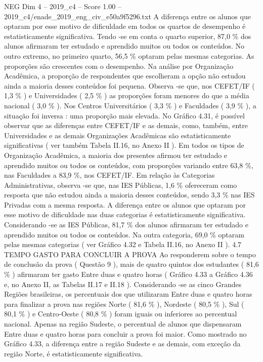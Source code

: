 \begin{textsample}{NEG Dim 4 – 2019\_c4 – Score 1.00 – 2019\_c4/enade\_2019\_eng\_civ\_e50a9f5296.txt}
A diferença entre os alunos que optaram por esse motivo de dificuldade em todos os quartos de desempenho é estatisticamente significativa.
Tendo -se em conta o quarto superior, 87,0 \% dos alunos afirmaram ter estudado e aprendido muitos ou todos os conteúdos.
No outro extremo, no primeiro quarto, 56,5 \% optaram pelas mesmas categorias.
As proporções são crescentes com o desempenho.
Na análise por Organização Acadêmica, a proporção de respondentes que escolheram a opção não estudou ainda a maioria desses conteúdos foi pequena.
Observa -se que, nos CEFET/IF ( 1,3 \% ) e Universidades ( 2,5 \% ) as proporções foram menores do que a média nacional ( 3,0 \% ).
Nos Centros Universitários ( 3,3 \% ) e Faculdades ( 3,9 \% ), a situação foi inversa : uma proporção mais elevada.
No Gráfico 4.31, é possível observar que as diferenças entre CEFET/IF e as demais, como, também, entre Universidades e as demais Organizações Acadêmicas são estatisticamente significativas ( ver também Tabela II.16, no Anexo II ).
Em todos os tipos de Organização Acadêmica, a maioria dos presentes afirmou ter estudado e aprendido muitos ou todos os conteúdos, com proporções variando entre 63,8 \%, nas Faculdades a 83,9 \%, nos CEFET/IF.
Em relação às Categorias Administrativas, observa -se que, nas IES Públicas, 1,6 \% ofereceram como resposta que não estudou ainda a maioria desses conteúdos, sendo 3,3 \% nas IES Privadas com a mesma resposta.
A diferença entre os alunos que optaram por esse motivo de dificuldade nas duas categorias é estatisticamente significativa.
Considerando -se as IES Públicas, 81,7 \% dos alunos afirmaram ter estudado e aprendido muitos ou todos os conteúdos.
Na outra categoria, 69,0 \% optaram pelas mesmas categorias ( ver Gráfico 4.32 e Tabela II.16, no Anexo II ). 4.7 TEMPO GASTO PARA CONCLUIR A PROVA Ao responderem sobre o tempo de conclusão da prova ( Questão 9 ), mais de quatro quintos dos estudantes ( 81,6 \% ) afirmaram ter gasto Entre duas e quatro horas ( Gráfico 4.33 a Gráfico 4.36 e, no Anexo II, as Tabelas II.17 e II.18 ).
Considerando -se as cinco Grandes Regiões brasileiras, os percentuais dos que utilizaram Entre duas e quatro horas para finalizar a prova nas regiões Norte ( 81,6 \% ), Nordeste ( 80,5 \% ), Sul ( 80,1 \% ) e Centro-Oeste ( 80,8 \% ) foram iguais ou inferiores ao percentual nacional.
Apenas na região Sudeste, o percentual de alunos que dispensaram Entre duas e quatro horas para concluir a prova foi maior.
Como mostrado no Gráfico 4.33, a diferença entre a região Sudeste e as demais, com exceção da região Norte, é estatisticamente significativa.

\end{textsample}
